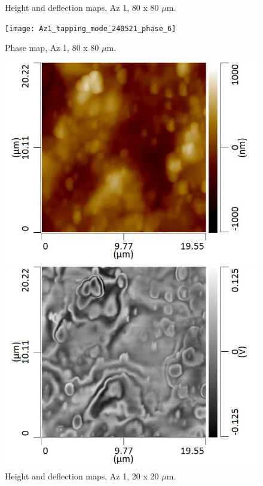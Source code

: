 \begin{figure}[H]
\begin{minipage}{.45\textwidth}
\end{minipage}
\caption[Height and deflection maps, Az 1]{Height and deflection maps, Az 1, 80 x 80 $\mu$m.}
\label{fig:afm_az1_height_def_6}
\end{figure}

\begin{figure}[H]
\centering
  \texttt{[image: Az1\_tapping\_mode\_240521\_phase\_6]}
\caption[Phase map, Az 1]{Phase map, Az 1, 80 x 80 $\mu$m.}
\label{fig:afm_az1_phase_6}
\end{figure}

\begin{figure}[H]
\centering
\begin{minipage}{.45\textwidth}
  \centering
  \includegraphics[width=\linewidth]{Az1_tapping_mode_240521_height_7}
\end{minipage}
\begin{minipage}{.45\textwidth}
  \centering
  \includegraphics[width=\linewidth]{Az1_tapping_mode_240521_def_7}
\end{minipage}
\caption[Height and deflection maps, Az 1]{Height and deflection maps, Az 1, 20 x 20 $\mu$m.}
\label{fig:afm_az1_height_def_7}
\end{figure}

